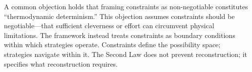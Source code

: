 A common objection holds that framing constraints as non-negotiable constitutes ``thermodynamic determinism.'' This objection assumes constraints should be negotiable---that sufficient cleverness or effort can circumvent physical limitations. The framework instead treats constraints as boundary conditions within which strategies operate. Constraints define the possibility space; strategies navigate within it. The Second Law does not prevent reconstruction; it specifies what reconstruction requires.

%
%
%
%
%
%
%
%
%
